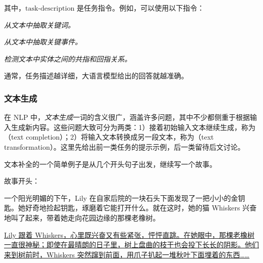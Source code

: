 \noindent 其中，$\mathrm{task\textrm{-}description}$ 是任务指令。例如，可以使用以下指令：

\vspace{0.3em}
\hspace{2em} \textit{从文本中抽取关键词。}

\vspace{0.3em}
\hspace{2em} \textit{从文本中抽取关键事件。}

\vspace{0.3em}
\hspace{2em} \textit{检测文本中实体之间的共指和回指关系。}

\vspace{0.3em}

\noindent 通常，任务描述越详细，大语言模型给出的回答就越准确。

\subsubsection{文本生成}

\noindent 在 NLP 中，\textit{文本生成}一词的含义很广，涵盖许多问题，其中不少都侧重于根据输入生成新内容。这些问题大致可分为两类：1）接着初始输入文本继续生成，称为（text completion）；2）将输入文本转换成另一段文本，称为（text transformation）。这里先给出前一类任务的提示示例，后一类留待后文讨论。

文本补全的一个简单例子是从几个开头句子出发，继续写一个故事。

\vspace{0.5em}
\begin{tcolorbox}

\begingroup
\setlength{\leftskip}{2em}
\setlength{\rightskip}{2em}


\vspace{0.7em}

故事开头：

一个阳光明媚的下午，Lily 在自家后院的一块石头下面发现了一把小小的金钥匙。她好奇地捡起钥匙，琢磨着它能打开什么。就在这时，她的猫 Whiskers 兴奋地叫了起来，带着她走向花园边缘的那棵老橡树。

\vspace{0.7em}

\uline{Lily 跟着 Whiskers，心里既兴奋又有些紧张，怦怦直跳。在她眼中，那棵老橡树一直很神秘；即使在最晴朗的日子里，树上盘曲的枝干也会投下长长的阴影。他们来到树前时，Whiskers 突然蹿到前面，用爪子扒起一堆秋叶下面埋着的东西……}

\endgroup

\end{tcolorbox}
\vspace{0.5em}

